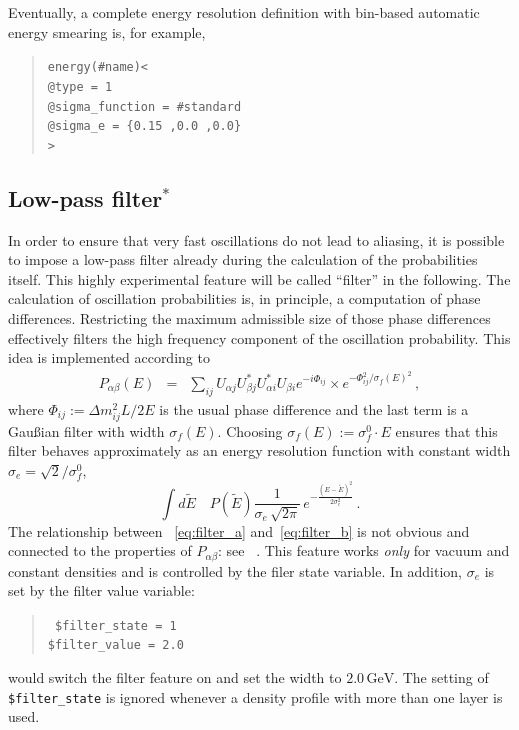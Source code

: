 Eventually,  a complete energy resolution definition with bin-based
automatic energy smearing is, for example,
\begin{quote}
{\tt energy(\#name)<\\
\tb @type = 1\\
\tb @sigma\_function = \#standard\\
\tb @sigma\_e = \{0.15 ,0.0 ,0.0\}\\
>
}
\end{quote}

\subsection{Low-pass filter$^*$}

In order to ensure that very fast oscillations do not lead to 
aliasing,
it is possible to impose a low-pass filter already during the calculation
of the probabilities itself. This highly
experimental feature will be called ``filter'' in the following. 
The calculation of oscillation
probabilities is, in principle, a computation of phase differences. Restricting the maximum admissible size of those phase differences effectively filters
the high frequency component of the oscillation probability. This idea is
implemented according to
\begin{eqnarray}
\label{eq:filter_a}
P_{\alpha\beta}(E)&=&\sum_{ij}
U_{\alpha j} U^*_{\beta j} U^*_{\alpha i} U_{\beta i} 
e^{-i\Phi_{ij}}\times 
e^{ -\Phi_{ij}^2/\sigma_f(E)^2 }\,,
\end{eqnarray}
where $\Phi_{ij}:=\Delta m_{ij}^2 L/2E$ is the usual phase difference and
the last term is a Gau\ss ian filter with width $\sigma_f(E)$. Choosing
$\sigma_f(E):=\sigma_f^0 \cdot E$ ensures that this filter behaves 
approximately as an energy resolution function with constant width 
$\sigma_e=\sqrt{2}/\sigma_f^0$, \ie\
\begin{equation}
\label{eq:filter_b}
\int d\tilde E\quad P(\tilde E) \frac{1}{\sigma_e\,\sqrt{2\pi}}\,
e^{-\frac{(E-\tilde E)^2}{2\sigma^2_e}}\,.
\end{equation}
The relationship between \eqs~\eqref{eq:filter_a} and~\eqref{eq:filter_b}
is not obvious and connected to the properties of $P_{\alpha\beta}$: 
see \Refs~\cite{Kiers:1996zj,Giunti:2003ax}. This feature works \emph{only} 
for vacuum and constant densities and is controlled
by the filer state variable. In addition, $\sigma_e$ is set by the filter value variable:
\index{aedl}{filter state@{\tt \$filter\_state}}
\begin{quote}
{\tt
\$filter\_state = 1\\
\$filter\_value = 2.0\\
}
\end{quote}
would switch the filter feature on and set the width to $2.0\,\mathrm{GeV}$.
The setting of {\tt \$filter\_state} is ignored whenever a density profile
with more than one layer is used. 

